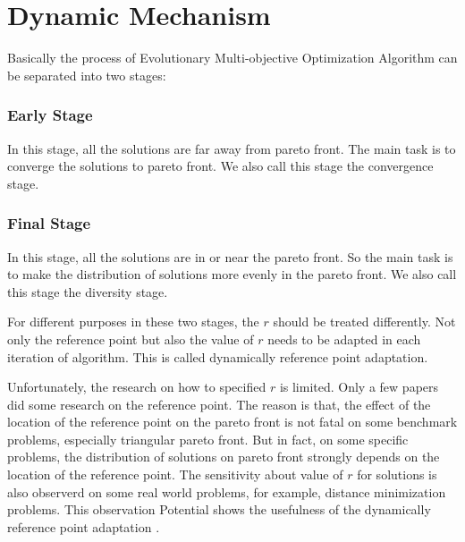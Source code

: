 \documentclass[conference]{IEEEtran}
\begin{document}
%
% 
\section{Dynamic Mechanism}
Basically the process of Evolutionary Multi-objective Optimization Algorithm can be separated into
two stages:
\subsubsection{Early Stage} In this stage, 
all the solutions are far away from pareto front.
The main task is to converge the solutions to pareto front.
We also call this stage the convergence stage.
\subsubsection{Final Stage} In this stage,
all the solutions are in or near the pareto front.
So the main task is to make the distribution of solutions more evenly in the pareto front.
We also call this stage the diversity stage.

For different purposes in these two stages, the $r$ should be treated differently\cite{ut}. 
Not only the reference point but also the value of $r$ 
needs to be adapted in each iteration of algorithm. 
This is called dynamically reference point adaptation. 

Unfortunately, the research on how to specified $r$ is limited.
Only a few papers\cite{hisao1, hisao2, hisao3, zhangqingfuHypE} 
did some research on the reference point. 
The reason is that, the effect of the location of the reference point on the pareto front 
is not fatal on some benchmark problems, especially triangular pareto front. 
But in fact, on some specific problems, the distribution of solutions on pareto front
strongly depends on the location of the reference point. 
The sensitivity about value of $r$ for solutions is also observerd on some real world problems,
for example, distance minimization problems.
This observation Potential shows the usefulness of the dynamically reference point adaptation
\cite{hisao}.
\end{document}
